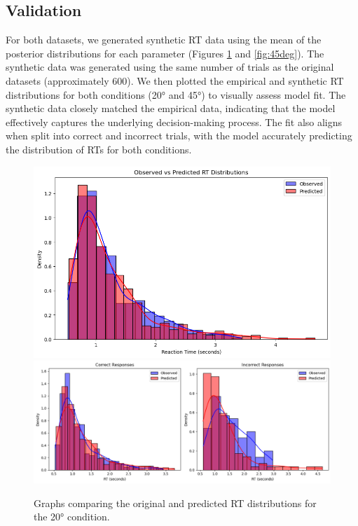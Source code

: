 \documentclass[12pt]{article}
\begin{document}
\subsection{Validation}
For both datasets, we generated synthetic RT data using the mean of the posterior distributions for each parameter (Figures \ref{fig:20deg} and \ref{fig:45deg}). The synthetic data was generated using the same number of trials as the original datasets (approximately 600). We then plotted the empirical and synthetic RT distributions for both conditions (20° and 45°) to visually assess model fit. The synthetic data closely matched the empirical data, indicating that the model effectively captures the underlying decision-making process. The fit also aligns when split into correct and incorrect trials, with the model accurately predicting the distribution of RTs for both conditions.
\begin{figure}[ht]
    \centering
    \includegraphics[scale=.4]{20_deg_obs_vs_pred.png}
    \includegraphics[scale=.4]{20_deg_obs_vs_pred_by_c.png}
    \caption{Graphs comparing the original and predicted RT distributions for the 20° condition.}
    \label{fig:20deg}
\end{figure}
\end{document}
